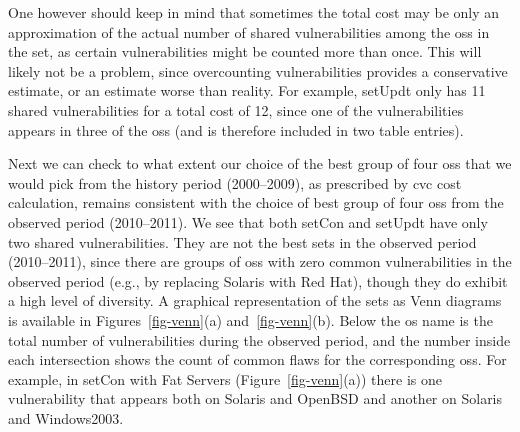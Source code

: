 One however should keep in mind that sometimes the total cost may be only an approximation of the actual number of shared vulnerabilities among the \glspl{os} in the set, as certain vulnerabilities might be counted more than once. 
This will likely not be a problem, since overcounting vulnerabilities provides a conservative estimate, or an estimate worse than reality. 
For example, setUpdt only has 11 shared vulnerabilities for a total cost of 12, since one of the vulnerabilities appears in three of the \glspl{os} (and is therefore included in two table entries).

Next we can check to what extent our choice of the best group of four \glspl{os} that we would pick from the history period (2000--2009), as prescribed by \gls{cvc} cost calculation, remains consistent with the choice of best group of four \glspl{os} from the observed period (2010--2011). 
We see that both setCon and setUpdt have only two shared vulnerabilities. 
They are not the best sets in the observed period (2010--2011), since there are groups of \glspl{os} with zero common vulnerabilities in the observed period (e.g., by replacing Solaris with Red Hat), though they do exhibit a high level of diversity. 
A graphical representation of the sets as Venn diagrams is available in Figures~\ref{fig-venn}(a) and~\ref{fig-venn}(b). 
Below the \gls{os} name is the total number of vulnerabilities during the observed period, and the number inside each intersection shows the count of common flaws for the corresponding \glspl{os}. 
For example, in setCon with Fat Servers (Figure~\ref{fig-venn}(a)) there is one vulnerability that appears both on Solaris and OpenBSD and another on Solaris and Windows2003.


